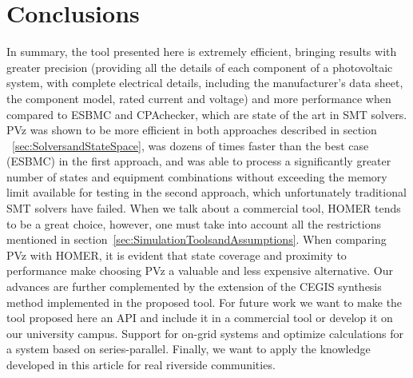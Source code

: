 \documentclass[10pt,journal,compsoc]{IEEEtran}
\begin{document}
\section{Conclusions} 
In summary, the tool presented here is extremely efficient, bringing results with greater precision (providing all the details of each component of a photovoltaic system, with complete electrical details, including the manufacturer's data sheet, the component model, rated current and voltage) and more performance when compared to ESBMC and CPAchecker, which are state of the art in SMT solvers. PVz was shown to be more efficient in both approaches described in section ~\ref{sec:SolversandStateSpace}, was dozens of times faster than the best case (ESBMC) in the first approach, and was able to process a significantly greater number of states and equipment combinations without exceeding the memory limit available for testing in the second approach, which unfortunately traditional SMT solvers have failed. When we talk about a commercial tool, HOMER tends to be a great choice, however, one must take into account all the restrictions mentioned in section~\ref{sec:SimulationToolsandAssumptions}. When comparing PVz with HOMER, it is evident that state coverage and proximity to performance make choosing PVz a valuable and less expensive alternative. Our advances are further complemented by the extension of the CEGIS synthesis method implemented in the proposed tool. For future work we want to make the tool proposed here an API and include it in a commercial tool or develop it on our university campus. Support for on-grid systems and optimize calculations for a system based on series-parallel. Finally, we want to apply the knowledge developed in this article for real riverside communities. \color{black}

%
\end{document}
